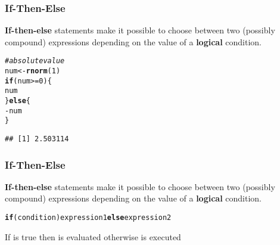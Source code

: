 \documentclass[12pt]{beamer}\usepackage[]{graphicx}\usepackage[]{color}
\makeatletter
\newcommand{\hlnum}[1]{\textcolor[rgb]{0.686,0.059,0.569}{#1}}%
\newcommand{\hlcom}[1]{\textcolor[rgb]{0.678,0.584,0.686}{\textit{#1}}}%
\newcommand{\hlopt}[1]{\textcolor[rgb]{0,0,0}{#1}}%
\newcommand{\hlstd}[1]{\textcolor[rgb]{0.345,0.345,0.345}{#1}}%
\newcommand{\hlkwa}[1]{\textcolor[rgb]{0.161,0.373,0.58}{\textbf{#1}}}%
\newcommand{\hlkwb}[1]{\textcolor[rgb]{0.69,0.353,0.396}{#1}}%
\newcommand{\hlkwd}[1]{\textcolor[rgb]{0.737,0.353,0.396}{\textbf{#1}}}%
\newenvironment{kframe}{%
 \def\at@end@of@kframe{}%
 \ifinner\ifhmode%
  \def\at@end@of@kframe{\end{minipage}}%
  \begin{minipage}{\columnwidth}%
 \fi\fi%
 \def\FrameCommand##1{\hskip\@totalleftmargin \hskip-\fboxsep
 \colorbox{shadecolor}{##1}\hskip-\fboxsep
     \hskip-\linewidth \hskip-\@totalleftmargin \hskip\columnwidth}%
 \MakeFramed {\advance\hsize-\width
   \@totalleftmargin\z@ \linewidth\hsize
   \@setminipage}}%
 {\par\unskip\endMakeFramed%
 \at@end@of@kframe}
\newenvironment{knitrout}{}{} %
\makeatother
\begin{document}
\begin{frame}[fragile]
\frametitle{If-Then-Else}

\textbf{If-then-else} statements make it possible to choose between two (possibly compound) expressions depending on the value of a \textbf{logical} condition.

\begin{knitrout}\footnotesize
{}\color{fgcolor}\begin{kframe}
\begin{alltt}
\hlcom{# absolute value}
\hlstd{num} \hlkwb{<-} \hlkwd{rnorm}\hlstd{(}\hlnum{1}\hlstd{)}
\hlkwa{if} \hlstd{(num} \hlopt{>=} \hlnum{0}\hlstd{) \{}
  \hlstd{num}
\hlstd{\}} \hlkwa{else} \hlstd{\{}
  \hlopt{-}\hlstd{num}
\hlstd{\}}
\end{alltt}
\begin{verbatim}
## [1] 2.503114
\end{verbatim}
\end{kframe}
\end{knitrout}

\end{frame}


\begin{frame}[fragile]
\frametitle{If-Then-Else}

\textbf{If-then-else} statements make it possible to choose between two (possibly compound) expressions depending on the value of a \textbf{logical} condition.

\begin{knitrout}\footnotesize
{}\color{fgcolor}\begin{kframe}
\begin{alltt}
\hlkwa{if} \hlstd{(condition) expression1} \hlkwa{else} \hlstd{expression2}
\end{alltt}
\end{kframe}
\end{knitrout}

If  is true then  is evaluated otherwise  is executed

\end{frame}

\end{document}
